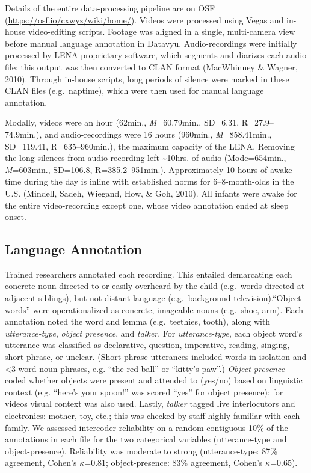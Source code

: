\documentclass[man]{apa6}
\theoremstyle{definition}
\theoremstyle{definition}
\theoremstyle{definition}
\theoremstyle{remark}
\begin{document}
Details of the entire data-processing pipeline are on OSF
(\url{https://osf.io/cxwyz/wiki/home/}). Videos were processed using
Vegas and in-house video-editing scripts. Footage was aligned in a
single, multi-camera view before manual language annotation in Datavyu.
Audio-recordings were initially processed by LENA proprietary software,
which segments and diarizes each audio file; this output was then
converted to CLAN format (MacWhinney \& Wagner, 2010). Through in-house
scripts, long periods of silence were marked in these CLAN files
(e.g.~naptime), which were then used for manual language annotation.

Modally, videos were an hour (62min., \emph{M}=60.79min., SD=6.31,
R=27.9--74.9min.), and audio-recordings were 16 hours (960min.,
\emph{M}=858.41min., SD=119.41, R=635--960min.), the maximum capacity of
the LENA. Removing the long silences from audio-recording left
\textasciitilde{}10hrs. of audio (Mode=654min., \emph{M}=603min.,
SD=106.8, R=385.2--951min.). Approximately 10 hours of awake-time during
the day is inline with established norms for 6--8-month-olds in the U.S.
(Mindell, Sadeh, Wiegand, How, \& Goh, 2010). All infants were awake for
the entire video-recording except one, whose video annotation ended at
sleep onset.

\subsection{Language Annotation}\label{language-annotation}

Trained researchers annotated each recording. This entailed demarcating
each concrete noun directed to or easily overheard by the child
(e.g.~words directed at adjacent siblings), but not distant language
(e.g.~background television).\enquote{Object words} were operationalized
as concrete, imageable nouns (e.g.~shoe, arm). Each annotation noted the
word and lemma (e.g.~teethies, tooth), along with \emph{utterance-type},
\emph{object presence}, and \emph{talker}. For \emph{utterance-type},
each object word's utterance was classified as declarative, question,
imperative, reading, singing, short-phrase, or unclear. (Short-phrase
utterances included words in isolation and \textless{}3 word
noun-phrases, e.g. \enquote{the red ball} or \enquote{kitty's paw}.)
\emph{Object-presence} coded whether objects were present and attended
to (yes/no) based on linguistic context (e.g. \enquote{here's your
spoon!} was scored \enquote{yes} for object presence); for videos visual
context was also used. Lastly, \emph{talker} tagged live interlocutors
and electronics: mother, toy, etc.; this was checked by staff highly
familiar with each family. We assessed intercoder reliability on a
random contiguous 10\% of the annotations in each file for the two
categorical variables (utterance-type and object-presence). Reliability
was moderate to strong (utterance-type: 87\% agreement, Cohen's
\(\kappa\)=0.81; object-presence: 83\% agreement, Cohen's
\(\kappa\)=0.65).
\end{document}
